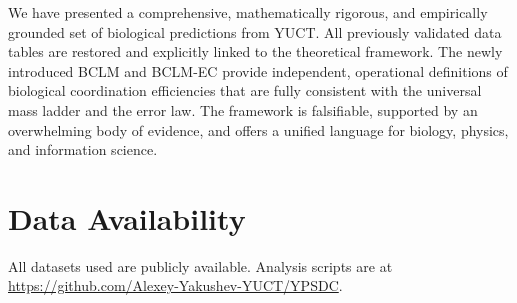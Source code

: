 \documentclass[11pt,a4paper]{article}
\begin{document}
	We have presented a comprehensive, mathematically rigorous, and empirically grounded set of biological predictions from YUCT. All previously validated data tables are restored and explicitly linked to the theoretical framework. The newly introduced BCLM and BCLM-EC provide independent, operational definitions of biological coordination efficiencies that are fully consistent with the universal mass ladder and the error law. The framework is falsifiable, supported by an overwhelming body of evidence, and offers a unified language for biology, physics, and information science.
	
	\section*{Data Availability}
	
	All datasets used are publicly available. Analysis scripts are at \url{https://github.com/Alexey-Yakushev-YUCT/YPSDC}.
	
\end{document}

